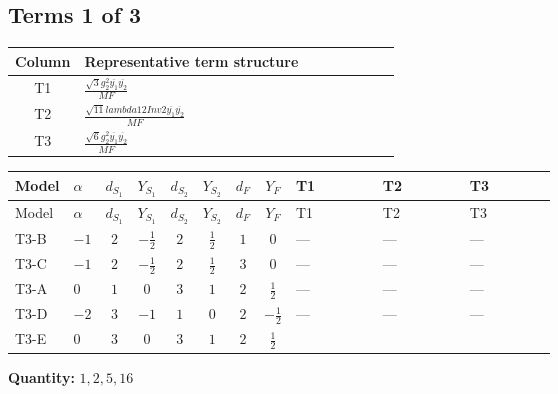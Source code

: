 \documentclass[8pt]{article}
\begin{document}
\begin{landscape}
\subsection*{Terms 1 of 3}
\begin{center}
\begin{tabular}{@{}c >{\raggedright\arraybackslash}p{0.82\linewidth}@{}}
\toprule
Column & Representative term structure \\
\midrule
T1 & \(\displaystyle \frac{\sqrt{3} g_{2}^{2} \overline{y_{1}} \overline{y_{2}}}{MF}\) \\
\midrule
T2 & \(\displaystyle \frac{\sqrt{11} lambda12Inv2 \overline{y_{1}} \overline{y_{2}}}{MF}\) \\
\midrule
T3 & \(\displaystyle \frac{\sqrt{6} g_{2}^{2} \overline{y_{1}} \overline{y_{2}}}{MF}\) \\
\midrule
\bottomrule
\end{tabular}
\end{center}
\smallskip
\tiny
\begin{longtable}{@{}llcccccc >{\raggedright\arraybackslash}p{0.21\linewidth} >{\raggedright\arraybackslash}p{0.21\linewidth} >{\raggedright\arraybackslash}p{0.21\linewidth}@{}}
\toprule
Model & $\alpha$ & $d_{S_1}$ & $Y_{S_1}$ & $d_{S_2}$ & $Y_{S_2}$ & $d_F$ & $Y_F$ & T1 & T2 & T3 \\
\midrule
\endfirsthead
\toprule
Model & $\alpha$ & $d_{S_1}$ & $Y_{S_1}$ & $d_{S_2}$ & $Y_{S_2}$ & $d_F$ & $Y_F$ & T1 & T2 & T3 \\
\midrule
\endhead
T3-B & $-1$ & $2$ & $-\frac{1}{2}$ & $2$ & $\frac{1}{2}$ & $1$ & $0$ & --- & --- & --- \\
\midrule
T3-C & $-1$ & $2$ & $-\frac{1}{2}$ & $2$ & $\frac{1}{2}$ & $3$ & $0$ & --- & --- & --- \\
\midrule
T3-A & $0$ & $1$ & $0$ & $3$ & $1$ & $2$ & $\frac{1}{2}$ & --- & --- & --- \\
\midrule
T3-D & $-2$ & $3$ & $-1$ & $1$ & $0$ & $2$ & $-\frac{1}{2}$ & --- & --- & --- \\
\midrule
T3-E & $0$ & $3$ & $0$ & $3$ & $1$ & $2$ & $\frac{1}{2}$ & \scriptsize\adjustbox{max width=\linewidth}{$\begin{gathered} - \frac{15 \sqrt{3} g_{2}^{2} \overline{y_{1}} \overline{y_{2}}}{8 MF}\end{gathered}$} & \scriptsize\adjustbox{max width=\linewidth}{$\begin{gathered} - \frac{3 \sqrt{11} lambda12Inv2 \overline{y_{1}} \overline{y_{2}}}{22 MF}\end{gathered}$} & \scriptsize\adjustbox{max width=\linewidth}{$\begin{gathered} - \frac{\sqrt{6} g_{2}^{2} \overline{y_{1}} \overline{y_{2}}}{6 MF}\end{gathered}$} \\
\midrule
\bottomrule
\end{longtable}
\clearpage
\noindent\textbf{Quantity: }$\mathrm{1,2,5,16}$\par\smallskip

\end{landscape}
\end{document}
